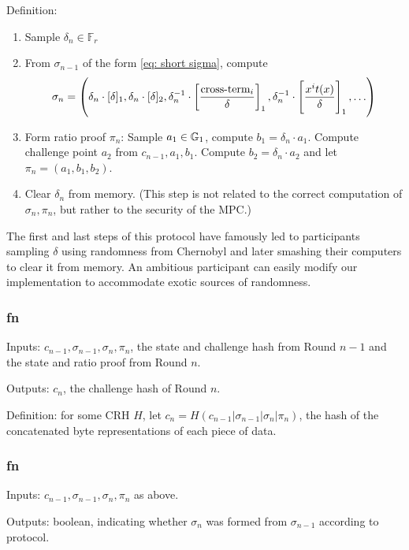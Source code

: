Definition: 
    \begin{enumerate}
        \item Sample $\delta_n \in \mathbb{F}_r$
        \item From $\sigma_{n-1}$ of the form \eqref{eq: short sigma}, compute 
            \begin{equation*}
                \sigma_n = \left( \delta_n\cdot [\delta]_1, \delta_n\cdot [\delta]_2, \delta_n^{-1} \cdot \left[\frac{\text{cross-term}_i }{\delta}\right]_1, \delta_n^{-1} \cdot \left[ \frac{x^i t(x)}{\delta} \right]_1 , \ldots \right)
            \end{equation*}
        \item Form ratio proof $\pi_n$: Sample $a_1 \in \mathbb{G}_1$, compute $b_1 = \delta_n \cdot a_1$. Compute challenge point $a_2$ from $c_{n-1}, a_1, b_1$. Compute $b_2 = \delta_n \cdot a_2$ and let $\pi_n = (a_1, b_1, b_2)$.
        \item Clear $\delta_n$ from memory. (This step is not related to the correct computation of $\sigma_n, \pi_n$, but rather to the security of the MPC.)
    \end{enumerate}
The first and last steps of this protocol have famously led to participants sampling $\delta$ using randomness from Chernobyl and later smashing their computers to clear it from memory. An ambitious participant can easily modify our implementation to accommodate exotic sources of randomness.

\subsubsection*{fn \challenge{}}
Inputs: $c_{n-1}, \sigma_{n-1}, \sigma_n, \pi_n$, the state and challenge hash from Round $n-1$ and the state and ratio proof from Round $n$.

Outputs: $c_n$, the challenge hash of Round $n$.

Definition: for some CRH $H$, let $c_n = H(c_{n-1} \vert \sigma_{n-1} \vert \sigma_n \vert \pi_n)$, the hash of the concatenated byte representations of each piece of data.

\subsubsection*{fn \verify{}}
Inputs: $c_{n-1}, \sigma_{n-1}, \sigma_n, \pi_n$ as above.

Outputs: boolean, indicating whether $\sigma_n$ was formed from $\sigma_{n-1}$ according to protocol.

